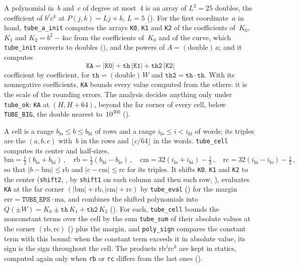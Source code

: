 A polynomial in~$b$ and~$c$ of degree at most~$4$ is an array of $L^2 = 25$ doubles, the
coefficient of $b^j c^k$ at $P(j, k) = Lj + k$, $L = 5$ (). For the
first coordinate~$a$ in hand, \texttt{tube\_a\_init} computes the arrays \texttt{K0}, \texttt{K1}
and \texttt{K2} of the coefficients of~$K_0$, $K_1$ and $K_2 = b^2 - 4ac$ from the coefficients
of~$K_0$ and of the curve, which \texttt{tube\_init} converts to doubles
(), and the powers of $A = (\mathrm{double})\,a$; and it computes
\[
  \mathtt{KA} = |\mathtt{K0}| + \mathtt{th}\,|\mathtt{K1}| + \mathtt{th2}\,|\mathtt{K2}|
\]
coefficient by coefficient, for $\mathtt{th} = (\mathrm{double})\,W$ and
$\mathtt{th2} = \mathtt{th} \cdot \mathtt{th}$. With its nonnegative coefficients, \texttt{KA}
bounds every value computed from the others: it is the scale of the rounding errors. The analysis
decides anything only under \texttt{tube\_ok}: \texttt{KA} at $(H, H + 64)$, beyond the far corner
of every cell, below \texttt{TUBE\_BIG}, the double nearest to~$10^{300}$
().

A cell is a range $b_{\mathrm{lo}} \le b \le b_{\mathrm{hi}}$ of rows and a range
$i_{\mathrm{lo}} \le i < i_{\mathrm{hi}}$ of words; its triples are the $(a, b, c)$ with~$b$ in the
rows and $\lfloor c/64 \rfloor$ in the words. \texttt{tube\_cell} computes its center and
half-sizes,
\[
  \mathrm{bm} = \tfrac12 (b_{\mathrm{lo}} + b_{\mathrm{hi}})\,, \quad
  \mathrm{rb} = \tfrac12 (b_{\mathrm{hi}} - b_{\mathrm{lo}})\,, \quad
  \mathrm{cm} = 32 (i_{\mathrm{lo}} + i_{\mathrm{hi}}) - \tfrac12\,, \quad
  \mathrm{rc} = 32 (i_{\mathrm{hi}} - i_{\mathrm{lo}}) - \tfrac12\,,
\]
so that $|b - \mathrm{bm}| \le \mathrm{rb}$ and $|c - \mathrm{cm}| \le \mathrm{rc}$ for its triples.
It shifts \texttt{K0}, \texttt{K1} and \texttt{K2} to the center (\texttt{shift2},
, by \texttt{shift1} on each column and then each row,
), evaluates \texttt{KA} at the far corner
$(|\mathrm{bm}| + \mathrm{rb}, |\mathrm{cm}| + \mathrm{rc})$ by \texttt{tube\_eval}
() for the margin $\mathrm{err} = \mathtt{TUBE\_EPS} \cdot \mathrm{ma}$,
and combines the shifted polynomials into
$Q(\pm W) = K_0 \pm \mathtt{th}\,K_1 + \mathtt{th2}\,K_2$ (). For each,
\texttt{tube\_cell} bounds the nonconstant terms over the cell by the sum \texttt{tube\_sum} of
their absolute values at the corner $(\mathrm{rb}, \mathrm{rc})$ ()
plus the margin, and \texttt{poly\_sign} compares the constant term with this bound: when the
constant term exceeds it in absolute value, its sign is the sign throughout the cell. The
products $\mathrm{rb}^j \mathrm{rc}^k$ are kept in statics, computed again only when \texttt{rb}
or \texttt{rc} differs from the last ones ().


